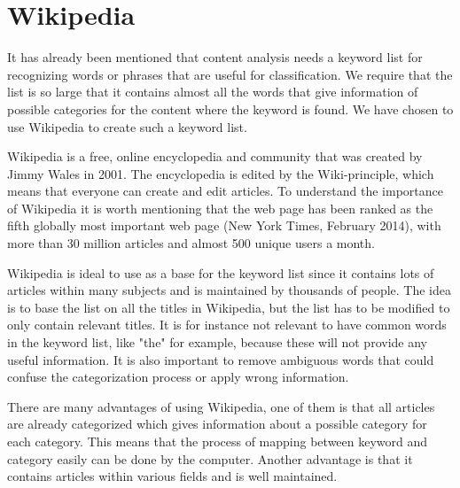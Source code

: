 \section{Wikipedia}
It has already been mentioned that content analysis needs a keyword list for recognizing words or phrases that are useful for classification. We require that the list is so large that it contains almost all the words that give information of possible categories for the content where the keyword is found.  We have chosen to use Wikipedia to create such a keyword list. 

Wikipedia is a free, online encyclopedia and community that was created by Jimmy Wales in 2001. The encyclopedia is edited by the Wiki-principle, which means that everyone can create and edit articles. To understand the importance of Wikipedia it is worth mentioning that the web page has been ranked as the fifth globally most important web page (New York Times, February 2014), with more than  30 million articles and almost 500 unique users a month. 

Wikipedia is ideal to use as a base for the keyword list since it contains lots of articles within many subjects and is maintained by thousands of people. The idea is to base the list on all the titles in Wikipedia, but the list has to be modified to only contain relevant titles. It is for instance not relevant to have common words in the keyword list, like "the" for example, because these will not provide any useful information. It is also important to remove ambiguous words that could confuse the categorization process or apply wrong information. 

There are many advantages of using Wikipedia, one of them is that all articles are already categorized which gives information about a possible category for each category. This means that the process of mapping between keyword and category  easily can be done by the computer. Another advantage is that it contains articles within various fields and is well maintained.